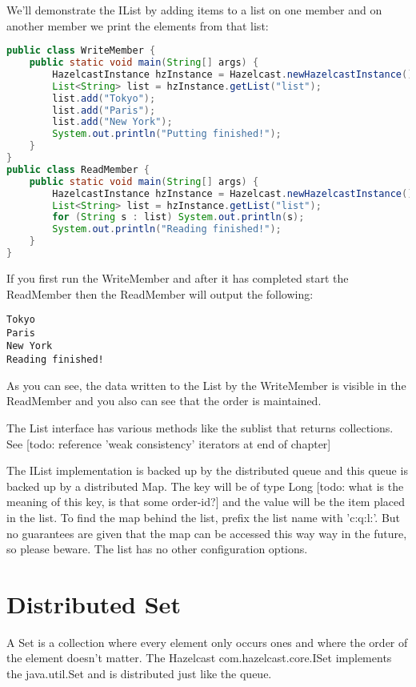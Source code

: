 We'll demonstrate the IList by adding items to a list on one member and on another member we print the elements from that list:
\begin{lstlisting}[language=java]
public class WriteMember {
    public static void main(String[] args) {
        HazelcastInstance hzInstance = Hazelcast.newHazelcastInstance();
        List<String> list = hzInstance.getList("list");
        list.add("Tokyo");
        list.add("Paris");
        list.add("New York");
        System.out.println("Putting finished!");
    }
}
public class ReadMember {
    public static void main(String[] args) {
        HazelcastInstance hzInstance = Hazelcast.newHazelcastInstance();
        List<String> list = hzInstance.getList("list");
        for (String s : list) System.out.println(s);
        System.out.println("Reading finished!");
    }
}
\end{lstlisting}
If you first run the WriteMember and after it has completed start the ReadMember then the ReadMember will output the following:
\begin{lstlisting}
Tokyo
Paris
New York
Reading finished!
\end{lstlisting}
As you can see, the data written to the List by the WriteMember is visible in the ReadMember and you also can see that the order is maintained.

The List interface has various methods like the sublist that returns collections. See [todo: reference 'weak consistency' iterators at end of chapter]

The IList implementation is backed up by the distributed queue and this queue is backed up by a distributed Map. The key will be of type Long [todo: what is the meaning of this key, is that some order-id?] and the value will be the item placed in the list. To find the map behind the list, prefix the list name with 'c:q:l:'. But no guarantees are given that the map can be accessed this way way in the future, so please beware. The list has no other configuration options.

\section{Distributed Set}
A Set is a collection where every element only occurs ones and where the order of the element doesn't matter. The Hazelcast com.hazelcast.core.ISet implements the java.util.Set and is distributed just like the queue.

